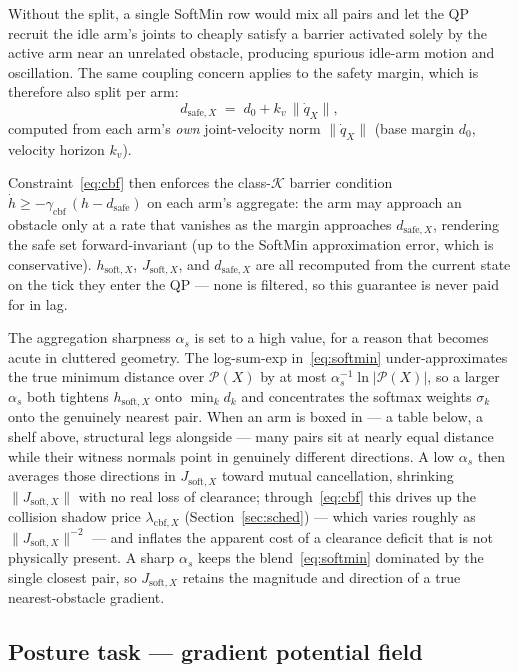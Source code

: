 \documentclass[12pt,a4paper,twoside,openright]{report}
\newcommand{\qdot}{\dot{q}}
\begin{document}
Without the split, a single SoftMin row would mix all pairs and let the QP recruit the idle arm's joints to cheaply satisfy a barrier activated solely by the active arm near an unrelated obstacle, producing spurious idle-arm motion and oscillation. The same coupling concern applies to the safety margin, which is therefore also split per arm:
\begin{equation}
d_{\text{safe},X} \;=\; d_0 + k_v\,\|\qdot_X\|,
\label{eq:dsafe}
\end{equation}
computed from each arm's \emph{own} joint-velocity norm $\|\qdot_X\|$ (base margin $d_0$, velocity horizon $k_v$).

Constraint~\eqref{eq:cbf} then enforces the class-$\mathcal{K}$ barrier condition $\dot{h} \ge -\gamma_{\text{cbf}}\,(h - d_{\text{safe}})$ on each arm's aggregate: the arm may approach an obstacle only at a rate that vanishes as the margin approaches $d_{\text{safe},X}$, rendering the safe set forward-invariant (up to the SoftMin approximation error, which is conservative). $h_{\text{soft},X}$, $J_{\text{soft},X}$, and $d_{\text{safe},X}$ are all recomputed from the current state on the tick they enter the QP --- none is filtered, so this guarantee is never paid for in lag.

The aggregation sharpness $\alpha_s$ is set to a high value, for a reason that becomes acute in cluttered geometry. The log-sum-exp in~\eqref{eq:softmin} under-approximates the true minimum distance over $\mathcal{P}(X)$ by at most $\alpha_s^{-1}\ln|\mathcal{P}(X)|$, so a larger $\alpha_s$ both tightens $h_{\text{soft},X}$ onto $\min_k d_k$ and concentrates the softmax weights $\sigma_k$ onto the genuinely nearest pair. When an arm is boxed in --- a table below, a shelf above, structural legs alongside --- many pairs sit at nearly equal distance while their witness normals point in genuinely different directions. A low $\alpha_s$ then averages those directions in $J_{\text{soft},X}$ toward mutual cancellation, shrinking $\|J_{\text{soft},X}\|$ with no real loss of clearance; through~\eqref{eq:cbf} this drives up the collision shadow price $\lambda_{\text{cbf},X}$ (Section~\ref{sec:sched}) --- which varies roughly as $\|J_{\text{soft},X}\|^{-2}$ --- and inflates the apparent cost of a clearance deficit that is not physically present. A sharp $\alpha_s$ keeps the blend~\eqref{eq:softmin} dominated by the single closest pair, so $J_{\text{soft},X}$ retains the magnitude and direction of a true nearest-obstacle gradient.

\subsection{Posture task --- gradient potential field}
\label{sec:posture}
\end{document}
